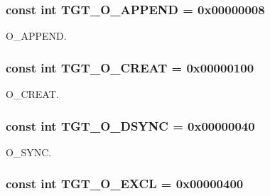 \label{classSparcSolaris_a0124e421d7846143bca15728b7a53e14}
\hypertarget{classSparcSolaris_af11adc5404ea3780a5ce2829cc3710b7}{
\subsubsection[{TGT\_\-O\_\-APPEND}]{\setlength{\rightskip}{0pt plus 5cm}const int {\bf TGT\_\-O\_\-APPEND} = 0x00000008}}
\label{classSparcSolaris_af11adc5404ea3780a5ce2829cc3710b7}


O\_\-APPEND. \hypertarget{classSparcSolaris_aec02e04ca367e6c3f4b46e4edc12efac}{
\subsubsection[{TGT\_\-O\_\-CREAT}]{\setlength{\rightskip}{0pt plus 5cm}const int {\bf TGT\_\-O\_\-CREAT} = 0x00000100}}
\label{classSparcSolaris_aec02e04ca367e6c3f4b46e4edc12efac}


O\_\-CREAT. \hypertarget{classSparcSolaris_ac8d84ac6abb2d868443e4559bed55ebe}{
\subsubsection[{TGT\_\-O\_\-DSYNC}]{\setlength{\rightskip}{0pt plus 5cm}const int {\bf TGT\_\-O\_\-DSYNC} = 0x00000040}}
\label{classSparcSolaris_ac8d84ac6abb2d868443e4559bed55ebe}


O\_\-SYNC. \hypertarget{classSparcSolaris_a10d5d118d15b51ebdd4b16dc78342d1d}{
\subsubsection[{TGT\_\-O\_\-EXCL}]{\setlength{\rightskip}{0pt plus 5cm}const int {\bf TGT\_\-O\_\-EXCL} = 0x00000400}}
\label{classSparcSolaris_a10d5d118d15b51ebdd4b16dc78342d1d}



